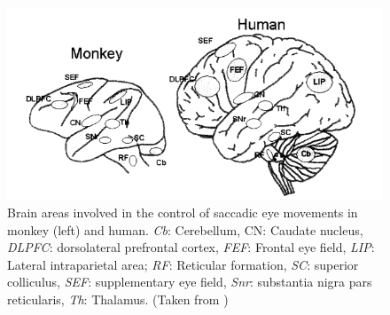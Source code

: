 \documentclass[a4paper, 12pt]{scrreprt}
\begin{document}
\begin{figure}
	\includegraphics[scale=0.5]{img/saccregions.png}
	\caption[Regions involved in saccadic eye movements]{\small{Brain areas involved in the control of saccadic eye movements in monkey (left) and human. \textit{Cb}: Cerebellum, CN: Caudate nucleus, \textit{DLPFC}: dorsolateral prefrontal cortex, \textit{FEF}: Frontal eye field, \textit{LIP}: Lateral intraparietal area; \textit{RF}: Reticular formation, \textit{SC}: superior colliculus, \textit{SEF}: supplementary eye field, \textit{Snr}: substantia nigra pars reticularis, \textit{Th}: Thalamus. (Taken from \textcite{munoz2002commentary})}}
	\label{fig:saccregions}
\end{figure}
\end{document}
